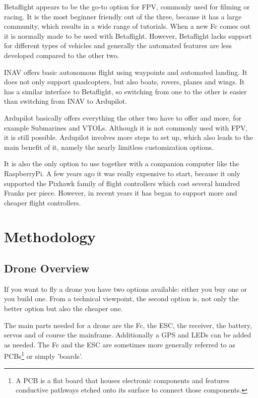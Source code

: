 \documentclass[svgnames]{article}
\begin{document}
	Betaflight appears to be the go-to option for \gls{FPV}, commonly used for filming or racing. It is the most beginner friendly out of the three, because it has a large community, which results in a wide range of tutorials. When a new \gls{Fc} comes out it is normally made to be used with Betaflight. However, Betaflight lacks support for different types of vehicles and generally the automated features are less developed compared to the other two. 
	
	INAV offers basic autonomous flight using waypoints and automated landing. It does not only support quadcopters, but also boats, rovers, planes and wings. It has a similar interface to Betaflight, so switching from one to the other is easier than switching from INAV to Ardupilot.
	
	Ardupilot basically offers everything the other two have to offer and more, for example Submarines and \glspl{VTOL}. Although it is not commonly used with \gls{FPV}, it is still possible. Ardupilot involves more steps to set up, which also leads to the main benefit of it, namely the nearly limitless customization options.
	
	It is also the only option to use together with a companion computer like the RaspberryPi. A few years ago it was really expensive to start, because it only supported the Pixhawk family of flight controllers which cost several hundred Franks per piece. However, in recent years it has began to support more and cheaper flight controllers.
	
	\section{Methodology}
	\subsection{Drone Overview}
	If you want to fly a drone you have two options available: either you buy one or you build one. From a technical viewpoint, the second option is, not only the better option but also the cheaper one.
	
	The main parts needed for a drone are the \gls{Fc}, the \gls{ESC}, the receiver, the battery, servos and of course the mainframe. Additionally a \gls{GPS} and LEDs can be added as needed. The \gls{Fc} and the \gls{ESC} are sometimes more generally referred to as \glspl{PCB}\footnote{A \gls{PCB} is a flat board that houses electronic components and features conductive pathways etched onto its surface to connect those components.} or simply 'boards'.
\end{document}

